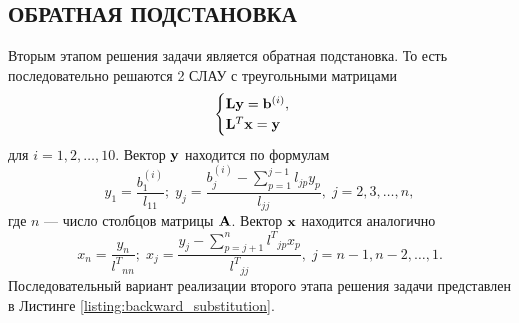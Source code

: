 \subsection{ОБРАТНАЯ ПОДСТАНОВКА}
Вторым этапом решения задачи является обратная подстановка. То есть последовательно решаются 2 СЛАУ с треугольными матрицами
$$
\begin{cases}
    \vb{L}\vb{y} = \vb{b}^{(i)},\\
    \vb{L}^T\vb{x} = \vb{y}
\end{cases}
$$
для $i=1,2,\ldots,10$. Вектор $\vb{y}$ находится по формулам
$$
y_1 = \dfrac{b^{(i)}_1}{l_{11}};\; y_{j} = \dfrac{b_j^{(i)} - \sum_{p=1}^{j-1} l_{jp} y_p}{l_{jj}},\; j=2,3,\ldots,n,
$$
где $n$ --- число столбцов матрицы $\vb{A}$. Вектор $\vb{x}$ находится аналогично
$$
x_n = \dfrac{y_n}{{l^T}_{nn}};\; x_{j} = \dfrac{y_j - \sum_{p=j+1}^{n} {l^T}_{jp} x_p}{{l^T}_{jj}},\; j=n-1,n-2,\ldots,1.
$$
Последовательный вариант реализации второго этапа решения задачи представлен в Листинге \ref{listing:backward_substitution}.